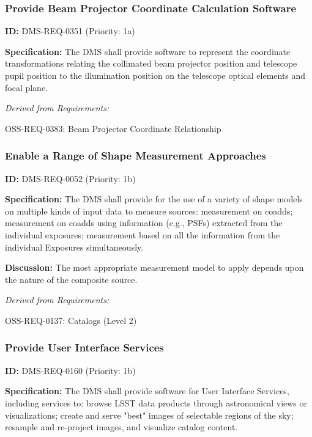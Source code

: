 \documentclass[SE,toc,lsstdraft]{lsstdoc}
\begin{document}
\subsubsection{Provide Beam Projector Coordinate Calculation Software}

\label{DMS-REQ-0351}
\textbf{ID:} DMS-REQ-0351 (Priority: 1a)

\textbf{Specification:}  The DMS shall provide software to represent the coordinate transformations relating the collimated beam projector position and telescope pupil position to the illumination position on the telescope optical elements and focal plane.

\emph{Derived from Requirements:}

OSS-REQ-0383:
Beam Projector Coordinate Relationship \newline

\subsubsection{Enable a Range of Shape Measurement Approaches}

\label{DMS-REQ-0052}
\textbf{ID:} DMS-REQ-0052 (Priority: 1b)

\textbf{Specification:} The DMS shall provide for the use of a variety of shape models on multiple kinds of input data to measure sources: measurement on coadds; measurement on coadds using information (e.g., PSFs) extracted from the individual exposures; measurement based on all the information from the individual Exposures simultaneously.

\textbf{Discussion: }The most appropriate measurement model to apply depends upon the nature of the composite source.

\emph{Derived from Requirements:}

OSS-REQ-0137:
Catalogs (Level 2) \newline

\subsubsection{Provide User Interface Services}

\label{DMS-REQ-0160}
\textbf{ID:} DMS-REQ-0160 (Priority: 1b)

\textbf{Specification:} The DMS shall provide software for User Interface Services, including services to: browse LSST data products through astronomical views or visualizations; create and serve "best" images of selectable regions of the sky; resample and re-project images, and visualize catalog content.
\end{document}
